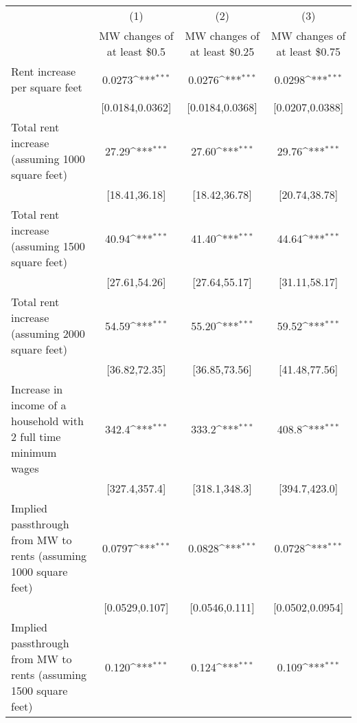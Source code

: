 {
\def\sym#1{\ifmmode^{#1}\else\(^{#1}\)\fi}
\begin{tabular}{l*{3}{c}}
\hline\hline
            &\multicolumn{1}{c}{(1)}        &\multicolumn{1}{c}{(2)}        &\multicolumn{1}{c}{(3)}        \\
            &\multicolumn{1}{c}{MW changes of at least \$0.5}&\multicolumn{1}{c}{MW changes of at least \$0.25}&\multicolumn{1}{c}{MW changes of at least \$0.75}\\
\hline
Rent increase per square feet&                0.0273\sym{***}&                0.0276\sym{***}&                0.0298\sym{***}\\
            &       [0.0184,0.0362]         &       [0.0184,0.0368]         &       [0.0207,0.0388]         \\
[1em]
Total rent increase (assuming 1000 square feet)&                 27.29\sym{***}&                 27.60\sym{***}&                 29.76\sym{***}\\
            &         [18.41,36.18]         &         [18.42,36.78]         &         [20.74,38.78]         \\
[1em]
Total rent increase (assuming 1500 square feet)&                 40.94\sym{***}&                 41.40\sym{***}&                 44.64\sym{***}\\
            &         [27.61,54.26]         &         [27.64,55.17]         &         [31.11,58.17]         \\
[1em]
Total rent increase (assuming 2000 square feet)&                 54.59\sym{***}&                 55.20\sym{***}&                 59.52\sym{***}\\
            &         [36.82,72.35]         &         [36.85,73.56]         &         [41.48,77.56]         \\
[1em]
Increase in income of a household with 2 full time minimum wages&                 342.4\sym{***}&                 333.2\sym{***}&                 408.8\sym{***}\\
            &         [327.4,357.4]         &         [318.1,348.3]         &         [394.7,423.0]         \\
[1em]
Implied passthrough from MW to rents (assuming 1000 square feet)&                0.0797\sym{***}&                0.0828\sym{***}&                0.0728\sym{***}\\
            &        [0.0529,0.107]         &        [0.0546,0.111]         &       [0.0502,0.0954]         \\
[1em]
Implied passthrough from MW to rents (assuming 1500 square feet)&                 0.120\sym{***}&                 0.124\sym{***}&                 0.109\sym{***}\\

\end{tabular}}

